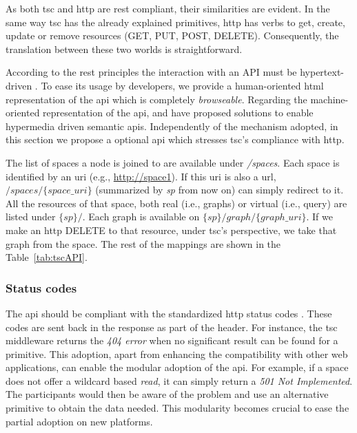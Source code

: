 As both \ac{tsc} and \ac{http} are \ac{rest} compliant, their similarities are evident.
In the same way \ac{tsc} has the already explained primitives, \ac{http} has verbs to get, create, update or remove resources (GET, PUT, POST, DELETE).
Consequently, the translation between these two worlds is straightforward.

\begin{sloppypar}
According to the \ac{rest} principles the interaction with an API must be hypertext-driven \citep{fielding_rest_2008}.
To ease its usage by developers, we provide a human-oriented \acs{html} representation of the \ac{api} which is completely \emph{browseable}.
Regarding the machine-oriented representation of the \ac{api}, \citet{verborgh_functional_2012} and \citet{kjernsmo_necessity_2012} have proposed solutions to enable hypermedia driven semantic \acp{api}. %
Independently of the mechanism adopted, in this section we propose a optional \ac{api} which stresses \ac{tsc}'s compliance with \ac{http}.
\end{sloppypar}

The list of spaces a node is joined to are available under \textit{/spaces}.
Each space is identified by an \acs{uri} (e.g., \url{http://space1}).
If this \acs{uri} is also a \acs{url}, $/spaces/\{space\_uri\}$ (summarized by \emph{sp} from now on) can simply redirect to it.
All the resources of that space, both real (i.e., graphs) or virtual (i.e., query) are listed under $\{sp\}/$.
Each graph is available on ${\{sp\}/graph/\{graph\_uri\}}$.
If we make an \acs{http} DELETE to that resource, under \ac{tsc}'s perspective, we take that graph from the space.
The rest of the mappings are shown in the Table~\ref{tab:tscAPI}.





\subsubsection{Status codes}
\label{sec:status_codes}
The \acs{api} should be compliant with the standardized \acs{http} status codes .
These codes are sent back in the response as part of the header.
For instance, the \ac{tsc} middleware returns the \emph{404 error} when no significant result can be found for a primitive.
This adoption, apart from enhancing the compatibility with other web applications, can enable the modular adoption of the \ac{api}.
For example, if a space does not offer a wildcard based \textit{read}, it can simply return a \emph{501 Not Implemented}.
The participants would then be aware of the problem and use an alternative primitive to obtain the data needed.
This modularity becomes crucial to ease the partial adoption on new platforms.


